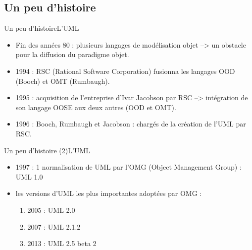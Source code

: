 \documentclass{beamer}
\begin{document}
  \subsection{Un peu d'histoire}
    \begin{frame}{Un peu d'histoire}{L'UML}
      \begin{itemize}
        \item {Fin des années 80 : plusieurs langages de modélisation objet --> un obstacle pour la diffusion du paradigme objet.\pause}
        \item<2->{1994 : RSC (Rational Software Corporation) fusionna les langages OOD (Booch) et OMT (Rumbaugh).}
        \item<3->{1995 : acquisition de l'entreprise d'Ivar Jacobson par RSC --> intégration de son langage OOSE aux deux autres (OOD et OMT).}
        \item<4->{1996 : Booch, Rumbaugh et Jacobson : chargés de la création de l'UML par RSC.}
      \end{itemize}
    \end{frame}

    \begin{frame}{Un peu d'histoire (2)}{L'UML}
      \begin{itemize}
        \item {1997 : 1 normalisation de UML par l'OMG (Object Management Group) : UML 1.0\pause}
        \item<2->{les versions d'UML les plus importantes adoptées par OMG :
          \begin{enumerate}
            \item {2005 : UML 2.0}
            \item {2007 : UML 2.1.2}
            \item {2013 : UML 2.5 beta 2}
          \end{enumerate}
        }
      \end{itemize}
    \end{frame}

\end{document}
